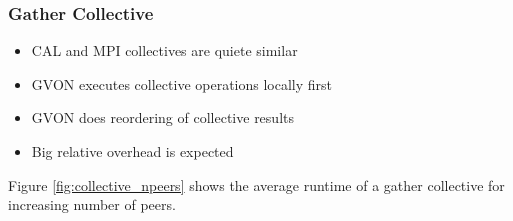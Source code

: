 \subsubsection*{Gather Collective}

\begin{itemize}
  \item CAL and MPI collectives are quiete similar
  \item GVON executes collective operations locally first
  \item GVON does reordering of collective results
  \item Big relative overhead is expected
\end{itemize}

Figure \ref{fig:collective_npeers} shows the average runtime of a
gather collective for increasing number of peers.

